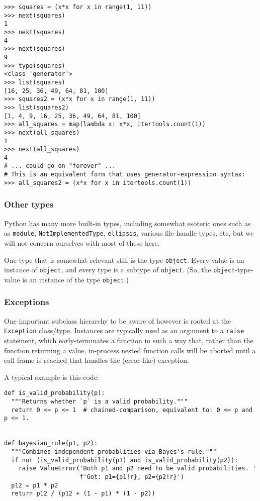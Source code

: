 \documentclass[11pt]{article}
\begin{document}
\begin{verbatim}
>>> squares = (x*x for x in range(1, 11))
>>> next(squares)
1
>>> next(squares)
4
>>> next(squares)
9
>>> type(squares)
<class 'generator'>
>>> list(squares)
[16, 25, 36, 49, 64, 81, 100]
>>> squares2 = (x*x for x in range(1, 11))
>>> list(squares2)
[1, 4, 9, 16, 25, 36, 49, 64, 81, 100]
>>> all_squares = map(lambda x: x*x, itertools.count(1))
>>> next(all_squares)
1
>>> next(all_squares)
4
# ... could go on "forever" ...
# This is an equivalent form that uses generator-expression syntax:
>>> all_squares2 = (x*x for x in itertools.count(1))
\end{verbatim}

\hypertarget{other-types}{%
\subsubsection{Other types}\label{other-types}}

Python has many more built-in types, including somewhat esoteric ones
such as as \texttt{module}, \texttt{NotImplementedType},
\texttt{ellipsis}, various file-handle types, etc, but we will not
concern ourselves with most of these here.

One type that is somewhat relevant still is the type \texttt{object}.
Every value is an instance of \texttt{object}, and every type is a
subtype of \texttt{object}. (So, the \texttt{object}-type-value is an
instance of the type \texttt{object}.)

\hypertarget{exceptions}{%
\subsubsection{Exceptions}\label{exceptions}}

One important subclass hierarchy to be aware of however is rooted at the
\texttt{Exception} class/type. Instances are typically used as an
argument to a \texttt{raise} statement, which early-terminates a
function in such a way that, rather than the function returning a value,
in-process nested function calls will be aborted until a call frame is
reached that handles the (error-like) exception.

A typical example is this code:

\begin{verbatim}
def is_valid_probability(p):
  """Returns whether `p` is a valid probability."""
  return 0 <= p <= 1  # chained-comparison, equivalent to: 0 <= p and p <= 1.


def bayesian_rule(p1, p2):
  """Combines independent probablities via Bayes's rule."""
  if not (is_valid_probability(p1) and is_valid_probability(p2)):
    raise ValueError('Both p1 and p2 need to be valid probabilities. '
                     f'Got: p1={p1!r}, p2={p2!r}')
  p12 = p1 * p2
  return p12 / (p12 + (1 - p1) * (1 - p2))  
\end{verbatim}
\end{document}
